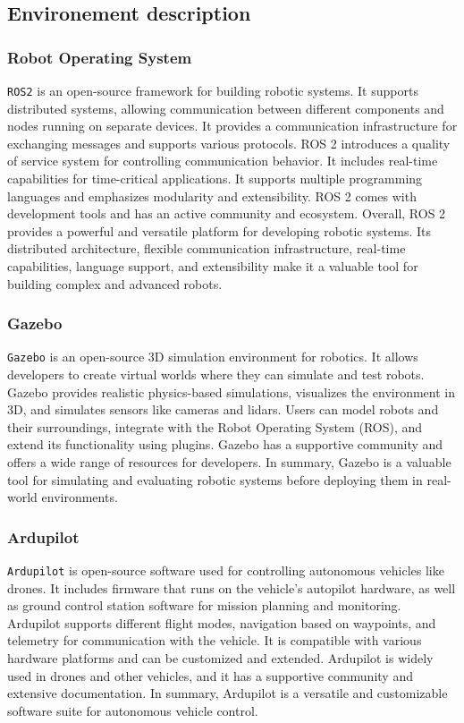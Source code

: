 \subsection{Environement description}
\subsubsection{Robot Operating System}
\texttt{ROS2} is an open-source framework for building robotic systems. It supports distributed systems, allowing communication between different components and nodes running on separate devices.
It provides a communication infrastructure for exchanging messages and supports various protocols. ROS 2 introduces a quality of service system for controlling communication behavior.
It includes real-time capabilities for time-critical applications. It supports multiple programming languages and emphasizes modularity and extensibility. ROS 2 comes with development tools and has an active community and ecosystem.
Overall, ROS 2 provides a powerful and versatile platform for developing robotic systems. Its distributed architecture, flexible communication infrastructure, real-time capabilities, language support, and extensibility make it a valuable tool for building complex and advanced robots.
\subsubsection{Gazebo}
\texttt{Gazebo} is an open-source 3D simulation environment for robotics. It allows developers to create virtual worlds where they can simulate and test robots. Gazebo provides realistic physics-based simulations, visualizes the environment in 3D, and simulates sensors like cameras and lidars.
Users can model robots and their surroundings, integrate with the Robot Operating System (ROS), and extend its functionality using plugins. Gazebo has a supportive community and offers a wide range of resources for developers.
In summary, Gazebo is a valuable tool for simulating and evaluating robotic systems before deploying them in real-world environments.
\subsubsection{Ardupilot}
\texttt{Ardupilot} is open-source software used for controlling autonomous vehicles like drones. It includes firmware that runs on the vehicle's autopilot hardware, as well as ground control station software for mission planning and monitoring.
Ardupilot supports different flight modes, navigation based on waypoints, and telemetry for communication with the vehicle. It is compatible with various hardware platforms and can be customized and extended.
Ardupilot is widely used in drones and other vehicles, and it has a supportive community and extensive documentation. In summary, Ardupilot is a versatile and customizable software suite for autonomous vehicle control.

